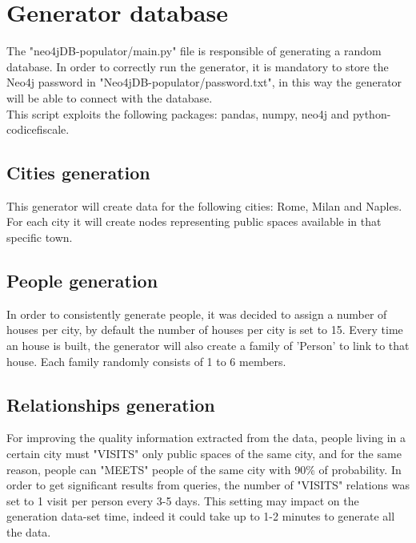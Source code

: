 \documentclass{article}
\begin{document}
\newpage

\section{Generator database}
The {\selectfont"neo4jDB-populator/main.py"} file is responsible of generating a random database.
In order to correctly run the generator, it is mandatory to store the Neo4j password in {\selectfont"Neo4jDB-populator/password.txt"}, in this way the generator will be able to connect with the database.
\\This script exploits the following packages: pandas, numpy, neo4j and python-codicefiscale.

\subsection{Cities generation}
This generator will create data for the following cities: Rome, Milan and Naples. For each city it will create nodes representing public spaces available in that specific town.

\subsection{People generation}
In order to consistently generate people, it was decided to assign a number of houses per city, by default the number of houses per city is set to 15. Every time an house is built, the generator will also create a family of 'Person' to link to that house.
Each family randomly consists of 1 to 6 members.

\subsection{Relationships generation}
For improving the quality information extracted from the data, people living in a certain city must "VISITS" only public spaces of the same city, and for the same reason, people can "MEETS" people of the same city with 90\% of probability.
In order to get significant results from queries, the number of "VISITS" relations was set to 1 visit per person every 3-5 days. This setting may impact on the generation data-set time, indeed it could take up to 1-2 minutes to generate all the data.
\end{document}
